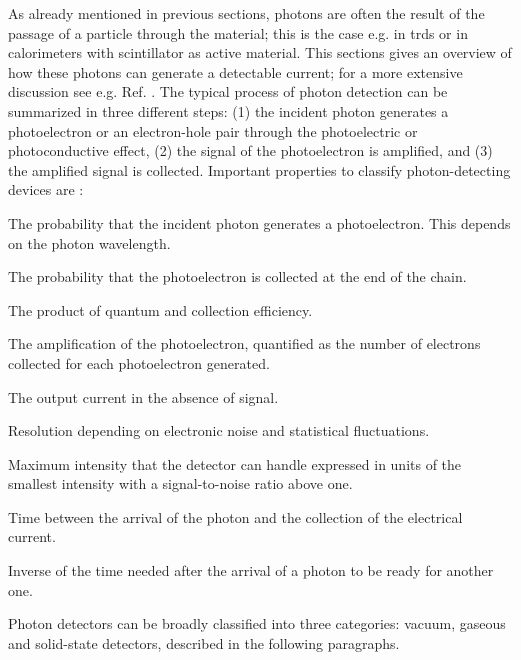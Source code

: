 As already mentioned in previous sections, photons are often the result of the passage of a particle through the material; 
this is the case e.g. in \glspl{trd} or in calorimeters with scintillator as active material. 
This sections gives an overview of how these photons can generate a detectable current; for a more extensive discussion see e.g. Ref. \cite{lightdetection,Grupen:2012zpa}. The typical process of photon detection can be summarized in three different steps: (1) the incident photon generates a photoelectron or an electron-hole pair through the photoelectric or photoconductive effect, (2) the signal of the photoelectron is  
amplified, and (3) the amplified signal is collected. Important properties to classify photon-detecting devices are \cite{Patrignani:2016xqp}:
\begin{description}[font=\normalfont]
\item[\textit{Quantum efficiency}:] The probability that the incident photon generates a photoelectron. This depends on the photon wavelength.
\item[\textit{Collection efficiency}:] The probability that the photoelectron is collected at the end of the chain.
\item[\textit{Photon detection efficiency}:] The product of quantum and collection efficiency.
\item[\textit{Gain}:] The amplification of the photoelectron, quantified as the number of electrons collected for each photoelectron generated.
\item[\textit{Dark current or dark noise}:] The output current in the absence of signal.
\item[\textit{Energy resolution}:] Resolution depending on electronic noise and statistical fluctuations.
\item[\textit{Dynamic range}:] Maximum intensity that the detector can handle expressed in units of the smallest intensity with a signal-to-noise ratio above one.
\item[\textit{Time dependence}:] Time between the arrival of the photon and the collection of the electrical current.
\item[\textit{Rate capability}:] Inverse of the time needed after the arrival of a photon to be ready for another one.
\end{description}

Photon detectors can be broadly classified into three categories: vacuum, gaseous and solid-state detectors, described in the following paragraphs.

